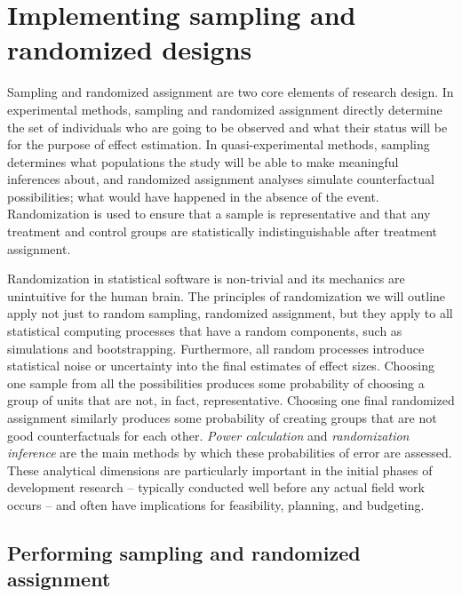 \section{Implementing sampling and randomized designs}

Sampling and randomized assignment are two core elements of research design.
In experimental methods, sampling and randomized assignment directly determine
the set of individuals who are going to be observed
and what their status will be for the purpose of effect estimation.
In quasi-experimental methods, sampling determines what populations the study
will be able to make meaningful inferences about,
and randomized assignment analyses simulate counterfactual possibilities;
what would have happened in the absence of the event.
Randomization is used to ensure that a sample is representative and
that any treatment and control groups are statistically indistinguishable
after treatment assignment.

Randomization in statistical software is non-trivial
and its mechanics are unintuitive for the human brain.
The principles of randomization we will outline
apply not just to random sampling, randomized assignment,
but they apply to all statistical computing processes that have a random components,
such as simulations and bootstrapping.
Furthermore, all random processes introduce statistical noise
or uncertainty into the final estimates of effect sizes.
Choosing one sample from all the possibilities produces some probability of
choosing a group of units that are not, in fact, representative.
Choosing one final randomized assignment similarly produces some probability of
creating groups that are not good counterfactuals for each other.
\textit{Power calculation} and \textit{randomization inference}
are the main methods by which these probabilities of error are assessed.
These analytical dimensions are particularly important in the initial phases of development research --
typically conducted well before any actual field work occurs --
and often have implications for feasibility, planning, and budgeting.

\subsection{Performing sampling and randomized assignment}


